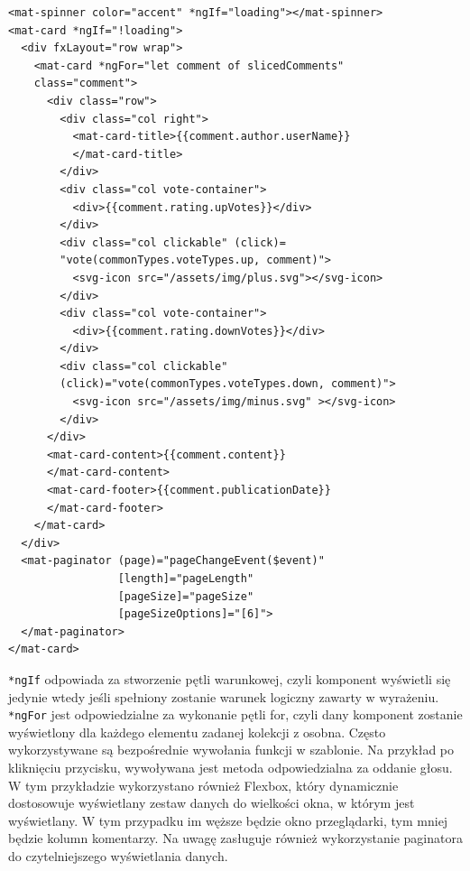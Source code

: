   \begin{lstlisting}[language=HTML5] 
  <mat-spinner color="accent" *ngIf="loading"></mat-spinner>
<mat-card *ngIf="!loading">
  <div fxLayout="row wrap">
    <mat-card *ngFor="let comment of slicedComments" 
    class="comment">
      <div class="row">
        <div class="col right">
          <mat-card-title>{{comment.author.userName}}
          </mat-card-title>
        </div>
        <div class="col vote-container">
          <div>{{comment.rating.upVotes}}</div>
        </div>
        <div class="col clickable" (click)=
        "vote(commonTypes.voteTypes.up, comment)">
          <svg-icon src="/assets/img/plus.svg"></svg-icon>
        </div>
        <div class="col vote-container">
          <div>{{comment.rating.downVotes}}</div>
        </div>
        <div class="col clickable" 
        (click)="vote(commonTypes.voteTypes.down, comment)">
          <svg-icon src="/assets/img/minus.svg" ></svg-icon>
        </div>
      </div>
      <mat-card-content>{{comment.content}}
      </mat-card-content>
      <mat-card-footer>{{comment.publicationDate}}
      </mat-card-footer>
    </mat-card>
  </div>
  <mat-paginator (page)="pageChangeEvent($event)"
                 [length]="pageLength"
                 [pageSize]="pageSize"
                 [pageSizeOptions]="[6]">
  </mat-paginator>
</mat-card>
   \end{lstlisting}
   \texttt{*ngIf} odpowiada za stworzenie pętli warunkowej, czyli komponent wyświetli się jedynie wtedy jeśli spełniony zostanie warunek logiczny zawarty w wyrażeniu. \texttt{*ngFor} jest odpowiedzialne za wykonanie pętli for, czyli dany komponent zostanie wyświetlony dla każdego elementu zadanej kolekcji z osobna. Często wykorzystywane są bezpośrednie wywołania funkcji w szablonie. Na przykład po kliknięciu przycisku, wywoływana jest metoda odpowiedzialna za oddanie głosu. W tym przykładzie wykorzystano również Flexbox, który dynamicznie dostosowuje wyświetlany zestaw danych do wielkości okna, w którym jest wyświetlany. W tym przypadku im węższe będzie okno przeglądarki, tym mniej będzie kolumn komentarzy. Na uwagę zasługuje również wykorzystanie paginatora do czytelniejszego wyświetlania danych.
